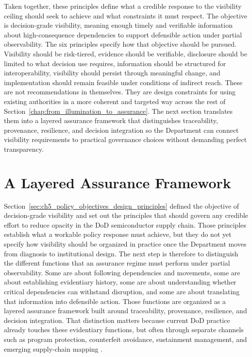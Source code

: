 Taken together, these principles define what a credible response to the visibility ceiling should seek to achieve and what constraints it must respect. The objective is decision-grade visibility, meaning enough timely and verifiable information about high-consequence dependencies to support defensible action under partial observability. The six principles specify how that objective should be pursued. Visibility should be risk-tiered, evidence should be verifiable, disclosure should be limited to what decision use requires, information should be structured for interoperability, visibility should persist through meaningful change, and implementation should remain feasible under conditions of indirect reach. These are not recommendations in themselves. They are design constraints for using existing authorities in a more coherent and targeted way across the rest of Section~\ref{chap:from_illumination_to_assurance}. The next section translates them into a layered assurance framework that distinguishes traceability, provenance, resilience, and decision integration so the Department can connect visibility requirements to practical governance choices without demanding perfect transparency.

\section{A Layered Assurance Framework}
\label{sec:ch5_layered_assurance_framework}

Section~\ref{sec:ch5_policy_objectives_design_principles} defined the objective of decision-grade visibility and set out the principles that should govern any credible effort to reduce opacity in the DoD semiconductor supply chain. Those principles establish what a workable policy response must achieve, but they do not yet specify how visibility should be organized in practice once the Department moves from diagnosis to institutional design. The next step is therefore to distinguish the different functions that an assurance regime must perform under partial observability. Some are about following dependencies and movements, some are about establishing evidentiary history, some are about understanding whether critical dependencies can withstand disruption, and some are about translating that information into defensible action. Those functions are organized as a layered assurance framework built around traceability, provenance, resilience, and decision integration. That distinction matters because current DoD practice already touches these evidentiary functions, but often through separate channels such as program protection, counterfeit avoidance, sustainment management, and emerging supply-chain mapping \parencite{ch5_dodi520044,ch5_dfars2522467007,ch5_dfars2522467008,ch5_dfars2522047020,ch5_dodi424515,ch5_ndaa2024_sec856}.


